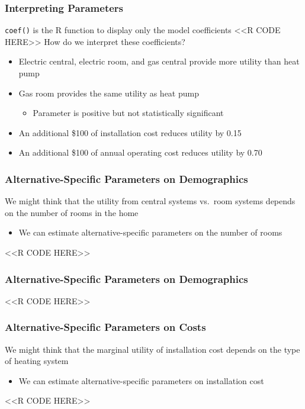 \documentclass{beamer}
\begin{document}
\begin{frame}[fragile]\frametitle{Interpreting Parameters}
    \texttt{coef()} is the R function to display only the model coefficients
    <<R CODE HERE>>
    \vspace{2ex}
    How do we interpret these coefficients?
    \begin{itemize}
        \item Electric central, electric room, and gas central provide more utility than heat pump
        \item Gas room provides the same utility as heat pump
        \begin{itemize}
        	\item Parameter is positive but not statistically significant
        \end{itemize}
        \item An additional \$100 of installation cost reduces utility by 0.15
        \item An additional \$100 of annual operating cost reduces utility by 0.70
    \end{itemize}
\end{frame}

\begin{frame}[fragile]\frametitle{Alternative-Specific Parameters on Demographics}
	We might think that the utility from central systems vs.\ room systems depends on the number of rooms in the home
	\begin{itemize}
		\item We can estimate alternative-specific parameters on the number of rooms
	\end{itemize}
    <<R CODE HERE>>
\end{frame}

\begin{frame}[fragile]\frametitle{Alternative-Specific Parameters on Demographics}
    \vspace{1ex}
    <<R CODE HERE>>
\end{frame}

\begin{frame}[fragile]\frametitle{Alternative-Specific Parameters on Costs}
	We might think that the marginal utility of installation cost depends on the type of heating system
	\begin{itemize}
		\item We can estimate alternative-specific parameters on installation cost
	\end{itemize}
    <<R CODE HERE>>
\end{frame}
\end{document}
